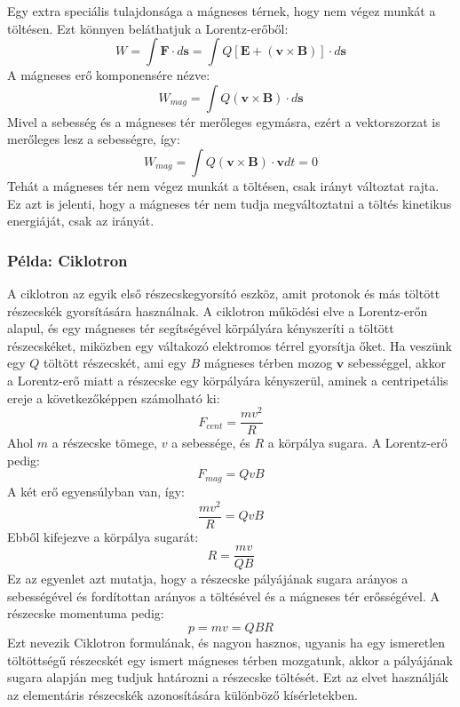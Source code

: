 \documentclass[../main.tex]{subfiles}
\begin{document}
Egy extra speciális tulajdonsága a mágneses térnek, hogy nem végez munkát a töltésen. Ezt könnyen beláthatjuk a Lorentz-erőből:
\begin{equation}
    W = \int \mathbf{F} \cdot d\mathbf{s} = \int Q \left[\mathbf{E} + (\mathbf{v} \times \mathbf{B})\right] \cdot d\mathbf{s}
\end{equation}
A mágneses erő komponensére nézve:
\begin{equation}
    W_{mag} = \int Q (\mathbf{v} \times \mathbf{B}) \cdot d\mathbf{s}
\end{equation}
Mivel a sebesség és a mágneses tér merőleges egymásra, ezért a vektorszorzat is merőleges lesz a sebességre, így:
\begin{equation}
    W_{mag} = \int Q (\mathbf{v} \times \mathbf{B}) \cdot \mathbf{v} dt = 0
\end{equation}
Tehát a mágneses tér nem végez munkát a töltésen, csak irányt változtat rajta. Ez azt is jelenti, hogy a mágneses tér nem tudja megváltoztatni a töltés kinetikus energiáját, csak az irányát.

\subsubsection*{Példa: Ciklotron}
A ciklotron az egyik első részecskegyorsító eszköz, amit protonok és más töltött részecskék gyorsítására használnak. A ciklotron működési elve a Lorentz-erőn alapul, és egy mágneses tér segítségével
körpályára kényszeríti a töltött részecskéket, miközben egy váltakozó elektromos térrel gyorsítja őket. Ha veszünk egy $Q$ töltött részecskét, ami egy $B$ mágneses térben mozog $\mathbf{v}$ sebességgel, akkor a Lorentz-erő miatt a részecske
egy körpályára kényszerül, aminek a centripetális ereje a következőképpen számolható ki:
\begin{equation}
    F_{cent} = \frac{m v^2}{R}
\end{equation}
Ahol $m$ a részecske tömege, $v$ a sebessége, és $R$ a körpálya sugara. A Lorentz-erő pedig:
\begin{equation}
    F_{mag} = Q v B
\end{equation}
A két erő egyensúlyban van, így:
\begin{equation}
    \frac{m v^2}{R} = Q v B
\end{equation}
Ebből kifejezve a körpálya sugarát:
\begin{equation}
    R = \frac{m v}{Q B}
\end{equation}
Ez az egyenlet azt mutatja, hogy a részecske pályájának sugara arányos a sebességével és fordítottan arányos a töltésével és a mágneses tér erősségével. A részecske momentuma pedig:
\begin{equation}
    p = m v = Q B R
\end{equation}
Ezt nevezik Ciklotron formulának, és nagyon hasznos, ugyanis ha egy ismeretlen töltöttségű részecskét egy ismert mágneses térben mozgatunk, akkor a pályájának sugara alapján meg tudjuk határozni a részecske töltését.
Ezt az elvet használják az elementáris részecskék azonosítására különböző kísérletekben.
\end{document}
